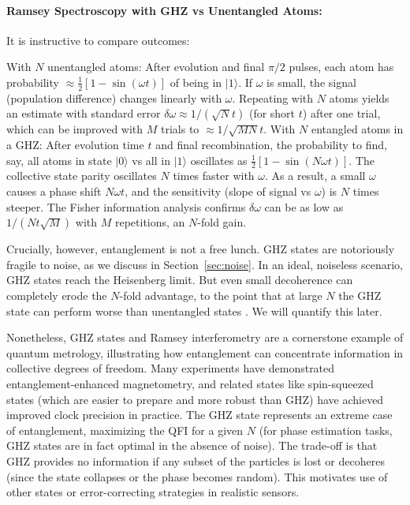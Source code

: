 \paragraph{Ramsey Spectroscopy with GHZ vs Unentangled Atoms:} It is instructive to compare outcomes:



With $N$ unentangled atoms: After evolution and final $\pi/2$ pulses,
each atom has probability $\approx \frac{1}{2}[1 - \sin(\omega t)]$ of
being in $|1\rangle$. If $\omega$ is small, the signal (population
difference) changes linearly with $\omega$. Repeating with $N$ atoms
yields an estimate with standard error $\delta\omega \approx
1/(\sqrt{N} t)$ (for short $t$) after one trial, which can be improved
with $M$ trials to $\approx 1/\sqrt{M N}t$.  With $N$ entangled atoms
in a GHZ: After evolution time $t$ and final recombination, the
probability to find, say, all atoms in state $|0\rangle$ vs all in
$|1\rangle$ oscillates as $\frac{1}{2}[1 - \sin(N \omega t)]$. The
collective state parity oscillates $N$ times faster with $\omega$. As
a result, a small $\omega$ causes a phase shift $N\omega t$, and the
sensitivity (slope of signal vs $\omega$) is $N$ times steeper. The
Fisher information analysis confirms $\delta\omega$ can be as low as
$1/(N t\sqrt{M})$ with $M$ repetitions, an $N$-fold gain.




Crucially, however, entanglement is not a free lunch. GHZ states are
notoriously fragile to noise, as we discuss in
Section~\ref{sec:noise}. In an ideal, noiseless scenario, GHZ states
reach the Heisenberg limit. But even small decoherence can completely
erode the $N$-fold advantage, to the point that at large $N$ the GHZ
state can perform worse than unentangled states \cite{Huelga1997}. We
will quantify this later.



Nonetheless, GHZ states and Ramsey interferometry are a cornerstone
example of quantum metrology, illustrating how entanglement can
concentrate information in collective degrees of freedom. Many
experiments have demonstrated entanglement-enhanced magnetometry, and
related states like spin-squeezed states (which are easier to prepare
and more robust than GHZ) have achieved improved clock precision in
practice. The GHZ state represents an extreme case of entanglement,
maximizing the QFI for a given $N$ (for phase estimation tasks, GHZ
states are in fact optimal in the absence of noise). The trade-off is
that GHZ provides no information if any subset of the particles is
lost or decoheres (since the state collapses or the phase becomes
random). This motivates use of other states or error-correcting
strategies in realistic sensors.



